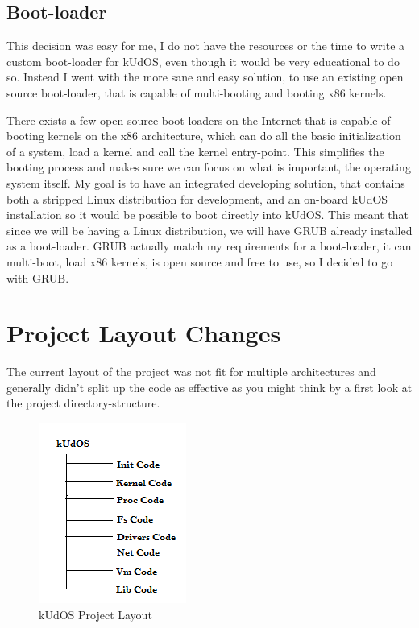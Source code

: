 \subsection{Boot-loader}

This decision was easy for me, I do not have the resources or the time to write a custom boot-loader for kUdOS, even though it would be very educational to do so. Instead I went with the more sane and easy solution, to use an existing open source boot-loader, that is capable of multi-booting and booting x86 kernels.

There exists a few open source boot-loaders on the Internet that is capable of booting kernels on the x86 architecture, which can do all the basic initialization of a system, load a kernel and call the kernel entry-point. This simplifies the booting process and makes sure we can focus on what is important, the operating system itself. 
My goal is to have an integrated developing solution, that contains both a stripped Linux distribution for development, and an on-board kUdOS installation so it would be possible to boot directly into kUdOS. This meant that since we will be having a Linux distribution, we will have GRUB already installed as a boot-loader. GRUB actually match my requirements for a boot-loader, it can multi-boot, load x86 kernels, is open source and free to use, so I decided to go with GRUB.

\section{Project Layout Changes}

The current layout of the project was not fit for multiple architectures and generally didn't split up the code as effective as you might think by a first look at the project directory-structure.

\begin{figure}[h]
    \centering
    \includegraphics{DirectoryLayoutBegin.png}
    \caption{kUdOS Project Layout}
    \label{fig:code_layout_end}
\end{figure}

